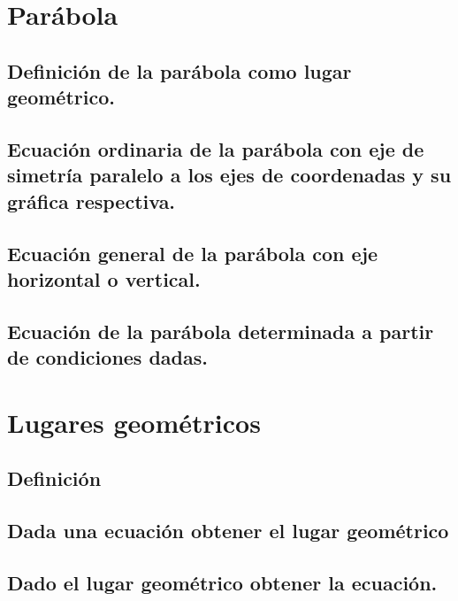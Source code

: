 \section{Parábola} %
\subsection{Definición de la parábola como lugar geométrico.}
\subsection{Ecuación ordinaria de la parábola con eje de simetría paralelo a los ejes de coordenadas y su gráfica respectiva.}
\subsection{Ecuación general de la parábola con eje horizontal o vertical.}
\subsection{Ecuación de la parábola determinada a partir de condiciones dadas. }










\section{Lugares geométricos} %
\subsection{Definición}
\subsection{Dada una ecuación obtener el lugar geométrico}
\subsection{Dado el lugar geométrico obtener la ecuación.}
